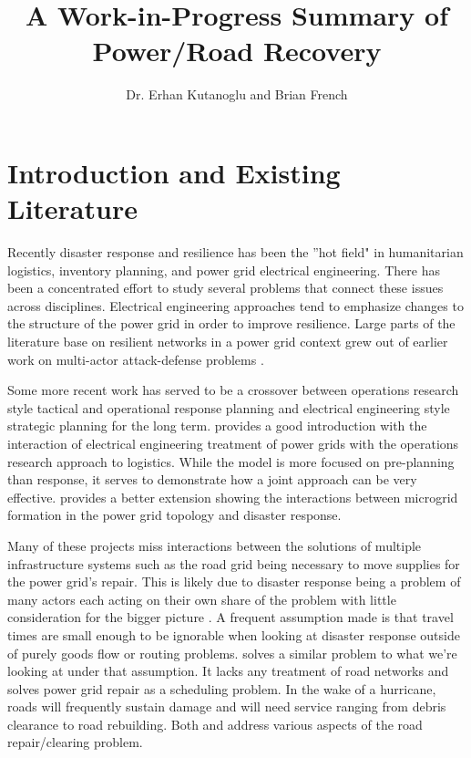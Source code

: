 \documentclass{article}
\begin{document}
\title{A Work-in-Progress Summary of Power/Road Recovery}
\author{Dr. Erhan Kutanoglu and Brian French}
\maketitle

	\section{Introduction and Existing Literature}
	Recently disaster response and resilience has been the ''hot field" in humanitarian logistics, inventory planning, and power grid electrical engineering. There has been a concentrated effort to study several problems that connect these issues across disciplines. Electrical engineering approaches tend to emphasize changes to the structure of the power grid \cite{PanteliEA2016} \cite{OuyangEA2014} in order to improve resilience. Large parts of the literature base on resilient networks in a power grid context grew out of earlier work on multi-actor attack-defense problems \cite{SalmeronEA2004} \cite{MolyneauxEA2016}. 

	
	Some more recent work has served to be a crossover between operations research style tactical and operational response planning and electrical engineering style strategic planning for the long term. \cite{ArabEA2015} provides a good introduction with the interaction of electrical engineering treatment of power grids with the operations research approach to logistics. While the model is more focused on pre-planning than response, it serves to demonstrate how a joint approach can be very effective. \cite{MousavizadehEA2018} provides a better extension showing the interactions between microgrid formation in the power grid topology and disaster response.
		

	
	Many of these projects miss interactions between the solutions of multiple infrastructure systems such as the road grid being necessary to move supplies for the power grid's repair. This is likely due to disaster response being a problem of many actors each acting on their own share of the problem with little consideration for the bigger picture \cite{VerasEA2012}. A frequent assumption made is that travel times are small enough to be ignorable when looking at disaster response outside of purely goods flow or routing problems. \cite{NPSMasters} solves a similar problem to what we're looking at under that assumption. It lacks any treatment of road networks and solves power grid repair as a scheduling problem. In the wake of a hurricane, roads will frequently sustain damage \cite{Houser2009} and will need service ranging from debris clearance to road rebuilding. Both \cite{AksuEA2014} and \cite{DuqueEA2016} address various aspects of the road repair/clearing problem.
	
\end{document}
